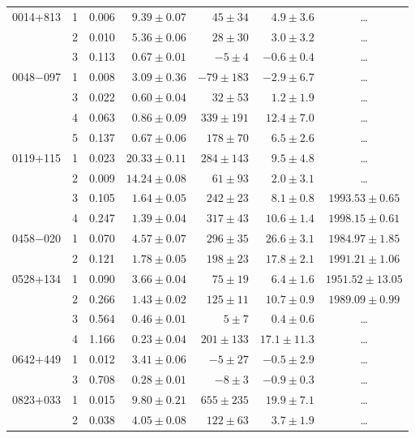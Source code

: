 \begin{table}
\begin{SingleSpace}
\begin{tabular}{l c r r r r c}
0014+813 &  1 &  0.006 & $ 9.39\pm 0.07$ & $  45\pm  34$ & $  4.9\pm 3.6$ & \dots \\
         &  2 &  0.010 & $ 5.36\pm 0.06$ & $  28\pm  30$ & $  3.0\pm 3.2$ & \dots \\
         &  3 &  0.113 & $ 0.67\pm 0.01$ & $  -5\pm   4$ & $ -0.6\pm 0.4$ & \dots \\
0048$-$097 &  1 &  0.008 & $ 3.09\pm 0.36$ & $ -79\pm 183$ & $ -2.9\pm 6.7$ & \dots \\
         &  3 &  0.022 & $ 0.60\pm 0.04$ & $  32\pm  53$ & $  1.2\pm 1.9$ & \dots \\
         &  4 &  0.063 & $ 0.86\pm 0.09$ & $ 339\pm 191$ & $ 12.4\pm 7.0$ & \dots \\
         &  5 &  0.137 & $ 0.67\pm 0.06$ & $ 178\pm  70$ & $  6.5\pm 2.6$ & \dots \\
0119+115 &  1 &  0.023 & $20.33\pm 0.11$ & $ 284\pm 143$ & $  9.5\pm 4.8$ & \dots \\
         &  2 &  0.009 & $14.24\pm 0.08$ & $  61\pm  93$ & $  2.0\pm 3.1$ & \dots \\
         &  3 &  0.105 & $ 1.64\pm 0.05$ & $ 242\pm  23$ & $  8.1\pm 0.8$ & $1993.53\pm   0.65$ \\
         &  4 &  0.247 & $ 1.39\pm 0.04$ & $ 317\pm  43$ & $ 10.6\pm 1.4$ & $1998.15\pm   0.61$ \\
0458$-$020 &  1 &  0.070 & $ 4.57\pm 0.07$ & $ 296\pm  35$ & $ 26.6\pm 3.1$ & $1984.97\pm   1.85$ \\
         &  2 &  0.121 & $ 1.78\pm 0.05$ & $ 198\pm  23$ & $ 17.8\pm 2.1$ & $1991.21\pm   1.06$ \\
0528+134 &  1 &  0.090 & $ 3.66\pm 0.04$ & $  75\pm  19$ & $  6.4\pm 1.6$ & $1951.52\pm  13.05$ \\
         &  2 &  0.266 & $ 1.43\pm 0.02$ & $ 125\pm  11$ & $ 10.7\pm 0.9$ & $1989.09\pm   0.99$ \\
         &  3 &  0.564 & $ 0.46\pm 0.01$ & $   5\pm   7$ & $  0.4\pm 0.6$ & \dots \\
         &  4 &  1.166 & $ 0.23\pm 0.04$ & $ 201\pm 133$ & $ 17.1\pm11.3$ & \dots \\
0642+449 &  1 &  0.012 & $ 3.41\pm 0.06$ & $  -5\pm  27$ & $ -0.5\pm 2.9$ & \dots \\
         &  3 &  0.708 & $ 0.28\pm 0.01$ & $  -8\pm   3$ & $ -0.9\pm 0.3$ & \dots \\
0823+033 &  1 &  0.015 & $ 9.80\pm 0.21$ & $ 655\pm 235$ & $ 19.9\pm 7.1$ & \dots \\
         &  2 &  0.038 & $ 4.05\pm 0.08$ & $ 122\pm  63$ & $  3.7\pm 1.9$ & \dots \\

\end{tabular}
\end{SingleSpace}
\end{table}

